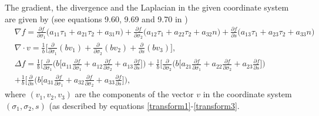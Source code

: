 \documentclass[12pt,a4paper]{article}
\theoremstyle{definition}
\theoremstyle{remark}
\numberwithin{equation}{section}
\begin{document}
The gradient, the divergence and the Laplacian in the given coordinate system are given by (see equations 9.60, 9.69 and 9.70 in \cite{grinfeld})
\begingroup
\allowdisplaybreaks
\begin{align}
&\nabla f = \frac{\partial f}{\partial \sigma_1} \big( a_{11} \tau_1 + a_{21} \tau_2 + a_{31} n \big) + \frac{\partial f}{\partial \sigma_2} \big( a_{12} \tau_1 + a_{22} \tau_2 + a_{32} n \big) + \frac{\partial f}{\partial s} \big( a_{13} \tau_1 + a_{23} \tau_2 + a_{33} n \big) \\
&\nabla \cdot v = \frac{1}{b} \bigg[ \frac{\partial}{\partial \sigma_1} ( b v_1) + \frac{\partial}{\partial \sigma_2} ( b v_2) + \frac{\partial}{\partial s} ( b v_3) \bigg], \label{divnewcoordinates} \\
&\Delta f = \frac{1}{b} \bigg[ \frac{\partial}{\partial \sigma_1} \bigg( b \bigg[  a_{11} \frac{\partial f}{\partial \sigma_1} +  a_{12} \frac{\partial f}{\partial \sigma_2} + a_{13} \frac{\partial f}{\partial s} \bigg] \bigg) + \frac{1}{b} \bigg[ \frac{\partial}{\partial \sigma_2} \bigg( b \bigg[ a_{21} \frac{\partial f}{\partial \sigma_1} + a_{22} \frac{\partial f}{\partial \sigma_2} + a_{23} \frac{\partial f}{\partial s} \bigg] \bigg) \nonumber \\
&+ \frac{1}{b} \bigg[ \frac{\partial}{\partial s} \bigg( b \bigg[ a_{31} \frac{\partial f}{\partial \sigma_1} + a_{32} \frac{\partial f}{\partial \sigma_2} + a_{33} \frac{\partial f}{\partial s} \bigg] \bigg),
\end{align}
\endgroup
where $(v_1, v_2, v_3)$ are the components of the vector $v$ in the coordinate system $(\sigma_1, \sigma_2, s)$ (as described by equations \eqref{transform1}-\eqref{transform3}.  
\end{document}
